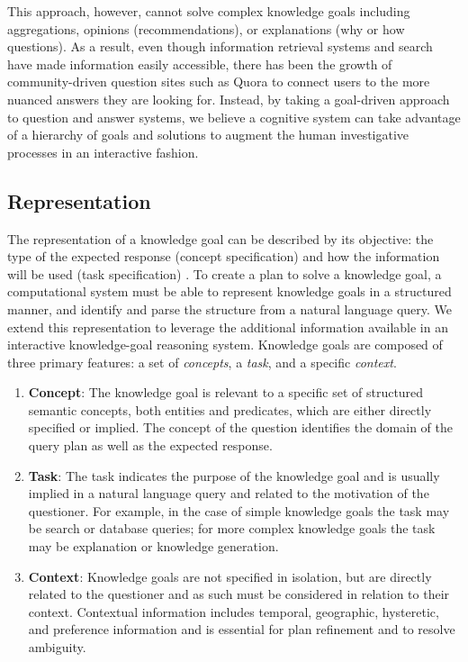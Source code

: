 \documentclass[letterpaper]{article}
\begin{document}
This approach, however, cannot solve complex knowledge goals including aggregations, opinions (recommendations), or explanations (why or how questions). As a result, even though information retrieval systems and search have made information easily accessible, there has been the growth of community-driven question sites such as Quora to connect users to the more nuanced answers they are looking for. Instead, by taking a goal-driven approach to question and answer systems, we believe a cognitive system can take advantage of a hierarchy of goals and solutions to augment the human investigative processes in an interactive fashion.

\subsection{Representation}

The representation of a knowledge goal can be described by its objective: the type of the expected response (concept specification) and how the information will be used (task specification) \cite{ram_theory_1991}. To create a plan to solve a knowledge goal, a computational system must be able to represent knowledge goals in a structured manner, and identify and parse the structure from a natural language query. We extend this representation to leverage the additional information available in an interactive knowledge-goal reasoning system. Knowledge goals are composed of three primary features: a set of \textit{concepts}, a \textit{task}, and a specific \textit{context}.

\begin{enumerate}

\item \textbf{Concept}: The knowledge goal is relevant to a specific set of structured semantic concepts, both entities and predicates, which are either directly specified or implied. The concept of the question identifies the domain of the query plan as well as the expected response.

\item \textbf{Task}: The task indicates the purpose of the knowledge goal and is usually implied in a natural language query and related to the motivation of the questioner. For example, in the case of simple knowledge goals the task may be search or database queries; for more complex knowledge goals the task may be explanation or knowledge generation.

\item \textbf{Context}: Knowledge goals are not specified in isolation, but are directly related to the questioner and as such must be considered in relation to their context. Contextual information includes temporal, geographic, hysteretic, and preference information and is essential for plan refinement and to resolve ambiguity.
\end{enumerate}
\end{document}
